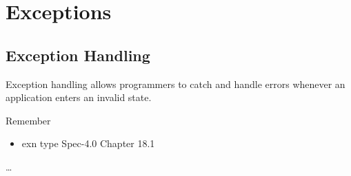 \chapter{Exceptions}
\label{chap:exceptions}
\section{Exception Handling}
Exception handling allows programmers to catch and handle errors whenever an application enters an invalid state.

Remember
\begin{itemize}
\item exn type Spec-4.0 Chapter 18.1
\end{itemize}
\dots 

